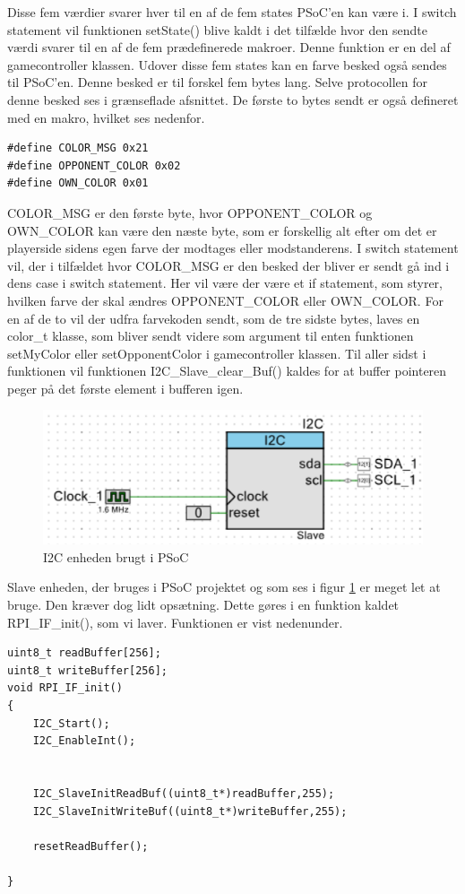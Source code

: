 \documentclass[Softwaredesign/Softwaredesign_main.tex]{subfiles}
\begin{document}
Disse fem værdier svarer hver til en af de fem states PSoC'en kan være i. I switch statement vil funktionen setState() blive kaldt i det tilfælde hvor den sendte værdi svarer til en af de fem prædefinerede makroer. Denne funktion er en del af gamecontroller klassen. Udover disse fem states kan en farve besked også sendes til PSoC'en. Denne besked er til forskel fem bytes lang. Selve protocollen for denne besked ses i grænseflade afsnittet. De første to bytes sendt er også defineret med en makro, hvilket ses nedenfor. 
\begin{lstlisting}
#define COLOR_MSG 0x21
#define OPPONENT_COLOR 0x02
#define OWN_COLOR 0x01
\end{lstlisting}
COLOR\_MSG er den første byte, hvor OPPONENT\_COLOR og OWN\_COLOR kan være den næste byte, som er forskellig alt efter om det er playerside sidens egen farve der modtages eller modstanderens. I switch statement vil, der i tilfældet hvor COLOR\_MSG er den besked der bliver er sendt gå ind i dens case i switch statement. Her vil være der være et if statement, som styrer, hvilken farve der skal ændres OPPONENT\_COLOR eller OWN\_COLOR. For en af de to vil der udfra farvekoden sendt, som de tre sidste bytes, laves en  color\_t klasse, som bliver sendt videre som argument til enten funktionen setMyColor eller setOpponentColor i gamecontroller klassen. Til aller sidst i funktionen vil funktionen I2C\_Slave\_clear\_Buf() kaldes for at buffer pointeren peger på det første element i bufferen igen.
\begin{figure}[H]
    \centering
    \includegraphics[width=1\textwidth]{Softwaredesign/RPI_IF/graphics/i2c_enhed.PNG}
    \caption{I2C enheden brugt i PSoC}
    \label{fig:i2c_enhed}
\end{figure}
Slave enheden, der bruges i PSoC projektet og som ses i figur \ref{fig:i2c_enhed} er meget let at bruge. Den kræver dog lidt opsætning. Dette gøres i en funktion kaldet RPI\_IF\_init(), som vi laver. Funktionen er vist nedenunder.
\begin{lstlisting}
uint8_t readBuffer[256];
uint8_t writeBuffer[256];
void RPI_IF_init()
{
    I2C_Start();
    I2C_EnableInt();
    
    
    I2C_SlaveInitReadBuf((uint8_t*)readBuffer,255);
    I2C_SlaveInitWriteBuf((uint8_t*)writeBuffer,255);
    
    resetReadBuffer();

}
\end{lstlisting}
\end{document}
